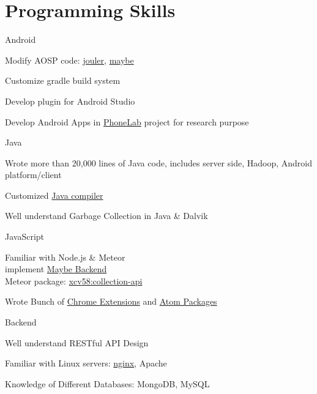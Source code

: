 

\section{Programming Skills}
\cvcomputer
{Android}{
\begin{tightitemize}
  \item Modify AOSP code:
  \href{http://platform.phone-lab.org:8080/gitweb?p=platform/frameworks/base.git;a=search;h=refs/heads/experiment/1/jouler;s=Yihong+Chen;st=author}{jouler},
  \href{http://platform.phone-lab.org:8080/gitweb?p=platform/frameworks/base.git;a=search;h=refs/heads/experiment/3/maybe;s=Yihong+Chen;st=author}{maybe}
  \item Customize gradle build system
  \item Develop plugin for Android Studio
  \item Develop Android Apps in
  \href{https://phone-lab.org/}{PhoneLab} project for research purpose
\end{tightitemize}
}
{Java}{
\begin{tightitemize}
  \item Wrote more than 20,000 lines of Java code, includes server side, Hadoop, Android platform/client
  \item Customized \href{https://github.com/blue-systems-group/project.maybe.polyglot}{Java compiler}
  \item Well understand Garbage Collection in Java \& Dalvik
\end{tightitemize}
}

\cvcomputer
{JavaScript}{
\begin{tightitemize}
  \item Familiar with Node.js \& Meteor
  \\implement \href{http://maybe.cse.buffalo.edu}{Maybe Backend}
  \\Meteor package:
  \href{https://atmospherejs.com/xcv58/collection-api}{xcv58:collection-api}
  \item Wrote Bunch of \href{https://chrome.google.com/webstore/search/xcv58?hl=en}{Chrome Extensions} and
  \href{https://atom.io/users/xcv58}{Atom Packages}
\end{tightitemize}
}
{Backend}{
\begin{tightitemize}
  \item Well understand RESTful API Design
  \item Familiar with Linux servers:
  \href{https://github.com/xcv58/nginx-config}{nginx}, Apache
  \item Knowledge of Different Databases: MongoDB, MySQL
\end{tightitemize}
}

